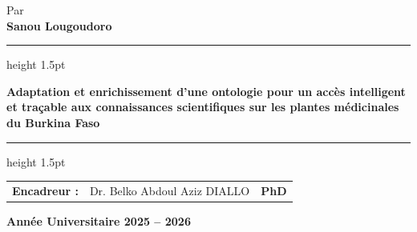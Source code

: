 \begin{center}
    {\large Par}\\[10pt]
    {\large \textbf{Sanou Lougoudoro}}

    \vspace{1.5cm}

    {\color{linecolor}\hrule height 1.5pt}
    \vspace{0.4cm}
    
    {\Large \textbf{Adaptation et enrichissement d'une ontologie pour un accès intelligent et traçable aux connaissances scientifiques sur les plantes médicinales du Burkina Faso}}
    
    \vspace{0.4cm}
    {\color{linecolor}\hrule height 1.5pt}

    \vspace{2.5cm}

    \begin{center}
        \large
        \begin{tabular}{p{3.5cm} l p{3.5cm}}
            \textbf{Encadreur :} & {Dr. Belko Abdoul Aziz DIALLO} & \textbf{PhD} \\[12pt]
        \end{tabular}
    \end{center}

    \vfill

    {\large \textbf{Année Universitaire 2025 -- 2026}}

\end{center}